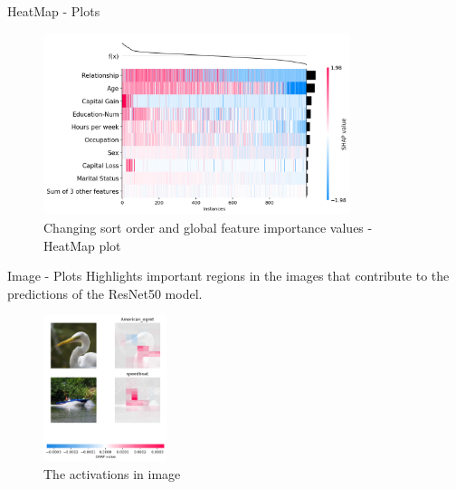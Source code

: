 \documentclass[aspectratio=169]{beamer}
\begin{document}
\begin{frame}{HeatMap - Plots}
    \begin{figure}[htbp]
        \centering
        \includegraphics[width=0.8\textwidth]{figs/shap/plots/heatmap/example_notebooks_api_examples_plots_heatmap_9_0.png}
        \caption{Changing sort order and global feature importance values - HeatMap plot}
        \label{fig:sort-heatmap}
    \end{figure}
\end{frame}

\begin{frame}{Image - Plots}
Highlights important regions in the images that contribute to the predictions of the ResNet50 model.
    \begin{figure}[htbp]
        \centering
        \includegraphics[width=0.32\textwidth]{figs/shap/plots/image/example_notebooks_api_examples_plots_image_1_3.png}
        \caption{The activations in image}
        \label{fig:activations-image}
    \end{figure}
\end{frame}
\end{document}
